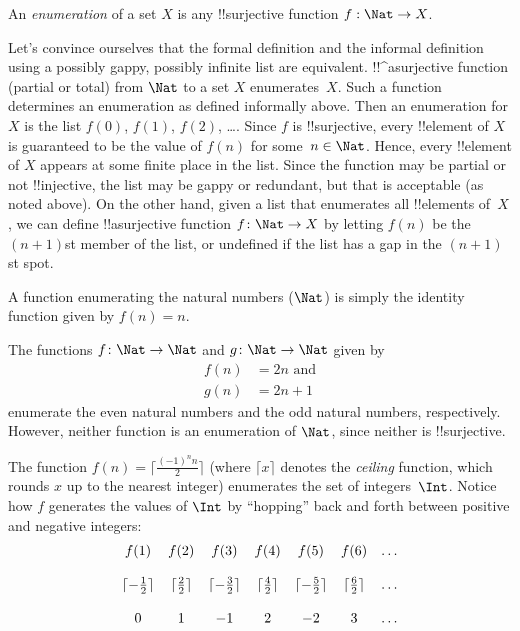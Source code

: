 \documentclass[../../../include/open-logic-section]{subfiles}
\begin{document}
\begin{defn}[Enumeration]
An \emph{enumeration} of a set $X$ is any !!{surjective} function $f:
\Nat \rightarrow X$.
\end{defn}

\begin{explain}
Let's convince ourselves that the formal definition and the informal
definition using a possibly gappy, possibly infinite list are
equivalent. !!^a{surjective} function (partial or total) from $\Nat$ to
a set $X$ enumerates~$X$. Such a function determines an enumeration as
defined informally above. Then an enumeration for $X$ is the list
$f(0)$, $f(1)$, $f(2)$, \dots. Since $f$ is !!{surjective}, every
!!{element} of $X$ is guaranteed to be the value of $f(n)$ for some~$n
\in \Nat$. Hence, every !!{element} of $X$ appears at some finite
place in the list. Since the function may be partial or not !!{injective},
the list may be gappy or redundant, but that is acceptable (as noted
above). On the other hand, given a list that enumerates all
!!{element}s of~$X$, we can define !!a{surjective} function $f\colon
\Nat \to X$ by letting $f(n)$ be the $(n+1)$st member of the list, or
undefined if the list has a gap in the $(n+1)$st spot.
\end{explain}

\begin{ex}
A function enumerating the natural numbers ($\Nat$) is
simply the identity function given by $f(n) = n$.
\end{ex}

\begin{ex}
The functions $f\colon \Nat \to \Nat$ and $g \colon \Nat \to \Nat$ given by
\begin{align}
f(n) & = 2n \text{ and}\\
g(n) & = 2n+1
\end{align}
enumerate the even natural numbers and the odd natural numbers,
respectively. However, neither function is an enumeration of
$\Nat$, since neither is !!{surjective}.
\end{ex}

\begin{ex}
The function $f(n) = \lceil \frac{(-1)^n n}{2}\rceil$ (where $\lceil x
\rceil$ denotes the \emph{ceiling} function, which rounds $x$ up to
the nearest integer) enumerates the set of integers~$\Int$. Notice
how $f$ generates the values of $\Int$ by ``hopping'' back and forth
between positive and negative integers:
\[
\begin{array}{c c c c c c c}
f(1) & f(2) & f(3) & f(4) & f(5) & f(6) & \dots \\ \\
\lceil - \tfrac{1}{2}\rceil & \lceil \tfrac{2}{2} \rceil & \lceil -
\tfrac{3}{2} \rceil & \lceil \tfrac{4}{2} \rceil  & \lceil -\tfrac{5}{2}
\rceil & \lceil \tfrac{6}{2} \rceil & \dots \\ \\
0 & 1 & -1 & 2 & -2 & 3 & \dots
\end{array}
\]
\end{ex}
\end{document}
